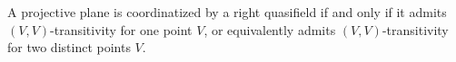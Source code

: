 A projective plane is coordinatized by a right quasifield if and only if it admits $(V,V)$-transitivity for one point $V$, or equivalently admits $(V,V)$-transitivity for two distinct points $V$.
